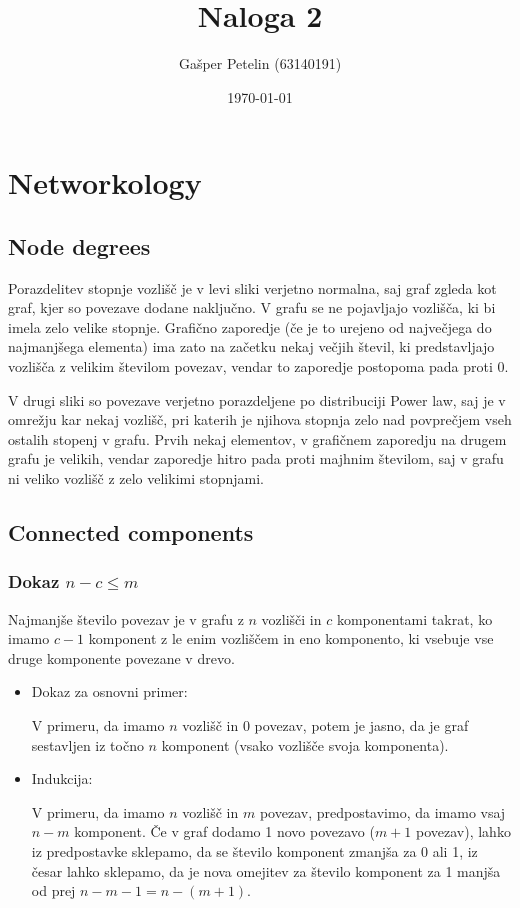 \documentclass[a4paper,11pt]{article}
\title{Naloga 2}
\author{Gašper Petelin (63140191)}
\date{\today}
\begin{document}
\providecommand\given{}
\DeclarePairedDelimiterXPP\Aver[1]{\mathbb{E}}{[}{]}{}{
\renewcommand\given{  \nonscript\:
  \delimsize\vert
  \nonscript\:
  \mathopen{}
  \allowbreak}
#1
}

\maketitle

\section{Networkology}

\subsection{Node degrees}

Porazdelitev stopnje vozlišč je v levi sliki verjetno normalna, saj graf zgleda kot graf, kjer so povezave dodane naključno. V grafu se ne pojavljajo vozlišča, ki bi imela zelo velike stopnje. Grafično zaporedje (če je to urejeno od največjega do najmanjšega elementa) ima zato na začetku nekaj večjih števil, ki predstavljajo vozlišča z velikim številom povezav, vendar to zaporedje postopoma pada proti 0.

V drugi sliki so povezave verjetno porazdeljene po distribuciji Power law, saj je v omrežju kar nekaj vozlišč, pri katerih je njihova stopnja zelo nad povprečjem vseh ostalih stopenj v grafu. Prvih nekaj elementov, v grafičnem zaporedju na drugem grafu je velikih, vendar zaporedje hitro pada proti majhnim številom, saj v grafu ni veliko vozlišč z zelo velikimi stopnjami.



\subsection{Connected components}

\subsubsection{Dokaz $n-c \leq m$}

Najmanjše število povezav je v grafu z $n$ vozlišči in $c$ komponentami takrat, ko imamo $c-1$ komponent z le enim vozliščem in eno komponento, ki vsebuje vse druge komponente povezane v drevo.


\begin{itemize}
\item Dokaz za osnovni primer:

V primeru, da imamo $n$ vozlišč in 0 povezav, potem je jasno, da je graf sestavljen iz točno $n$ komponent (vsako vozlišče svoja komponenta).
\item Indukcija:

V primeru, da imamo $n$ vozlišč in $m$ povezav, predpostavimo, da imamo vsaj $n-m$ komponent. Če v graf dodamo 1 novo povezavo ($m+1$ povezav), lahko iz predpostavke sklepamo, da se število komponent zmanjša za 0 ali 1, iz česar lahko sklepamo, da je nova omejitev za število komponent za 1 manjša od prej $ n-m-1 = n-(m+1)$.
\end{itemize}
\end{document}
